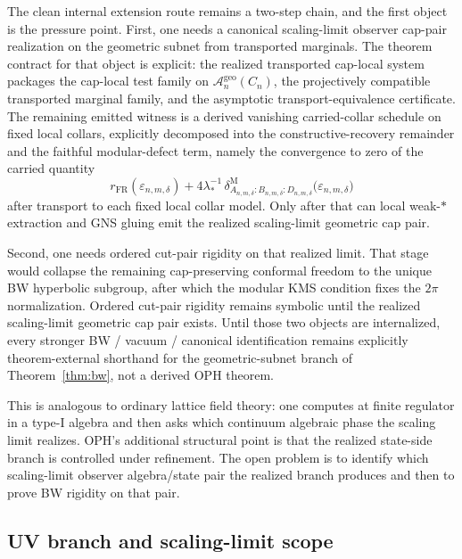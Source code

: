 \documentclass[11pt]{article}
\begin{document}
The clean internal extension route remains a two-step chain, and the first object is the pressure point. First, one needs a canonical scaling-limit observer cap-pair realization on the geometric subnet from transported marginals. The theorem contract for that object is explicit: the realized transported cap-local system packages the cap-local test family on \(\mathcal A_n^{\mathrm{geo}}(C_n)\), the projectively compatible transported marginal family, and the asymptotic transport-equivalence certificate. The remaining emitted witness is a derived vanishing carried-collar schedule on fixed local collars, explicitly decomposed into the constructive-recovery remainder and the faithful modular-defect term, namely the convergence to zero of the carried quantity
\[
r_{\mathrm{FR}}(\varepsilon_{n,m,\delta})
+
4\lambda_\ast^{-1}\,
\delta^{\mathrm M}_{A_{n,m,\delta}:B_{n,m,\delta}:D_{n,m,\delta}}
\bigl(\varepsilon_{n,m,\delta}\bigr)
\]
after transport to each fixed local collar model. Only after that can local weak-\(*\) extraction and GNS gluing emit the realized scaling-limit geometric cap pair.

Second, one needs ordered cut-pair rigidity on that realized limit. That stage would collapse the remaining cap-preserving conformal freedom to the unique BW hyperbolic subgroup, after which the modular KMS condition fixes the \(2\pi\) normalization. Ordered cut-pair rigidity remains symbolic until the realized scaling-limit geometric cap pair exists. Until those two objects are internalized, every stronger BW / vacuum / canonical identification remains explicitly theorem-external shorthand for the geometric-subnet branch of Theorem~\ref{thm:bw}, not a derived OPH theorem.

This is analogous to ordinary lattice field theory: one computes at finite regulator in a type-I algebra and then asks which continuum algebraic phase the scaling limit realizes. OPH's additional structural point is that the realized state-side branch is controlled under refinement. The open problem is to identify which scaling-limit observer algebra/state pair the realized branch produces and then to prove BW rigidity on that pair.
\subsection{UV branch and scaling-limit scope}
\end{document}
